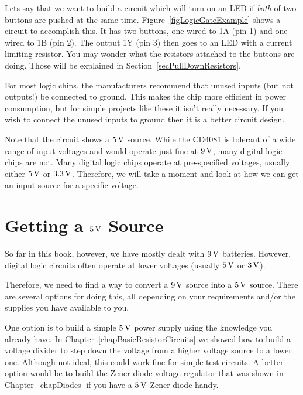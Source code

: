 Lets say that we want to build a circuit which will turn on an LED if \emph{both} of two buttons are pushed at the same time.
Figure~\ref{figLogicGateExample} shows a circuit to accomplish this.
It has two buttons, one wired to 1A (pin 1) and one wired to 1B (pin 2).
The output 1Y (pin 3) then goes to an LED with a current limiting resistor.
You may wonder what the resistors attached to the buttons are doing.
Those will be explained in Section~\ref{secPullDownResistors}.

For most logic chips, the manufacturers recommend that unused inputs (but not outputs!) be connected to ground. 
This makes the chip more efficient in power consumption, but for simple projects like these it isn't really necessary.
If you wish to connect the unused inputs to ground then it is a better circuit design.

Note that the circuit shows a $5\,\si{\volt}$ source.
While the CD4081 is tolerant of a wide range of input voltages and would operate just fine at $9\,\si{\volt}$, many digital logic chips are not.
Many digital logic chips operate at pre-specified voltages, usually either $5\,\si{\volt}$ or $3.3\,\si{\volt}$.
Therefore, we will take a moment and look at how we can get an input source for a specific voltage.

\section{Getting a $5\,\si{\volt}$ Source}

So far in this book, however, we have mostly dealt with $9\,\si{\volt}$ batteries.
However, digital logic circuits often operate at lower voltages (usually $5\,\si{\volt}$ or $3\,\si{\volt}$).

Therefore, we need to find a way to convert a $9\,\si{\volt}$ source into a $5\,\si{\volt}$ source.
There are several options for doing this, all depending on your requirements and/or the supplies you have available to you.

One option is to build a simple $5\,\si{\volt}$ power supply using the knowledge you already have.
In Chapter~\ref{chapBasicResistorCircuits} we showed how to build a voltage divider to step down the voltage from a higher voltage source to a lower one.
Although not ideal, this could work fine for simple test circuits.
A better option would be to build the Zener diode voltage regulator that was shown in Chapter~\ref{chapDiodes} if you have a $5\,\si{\volt}$ Zener diode handy.


